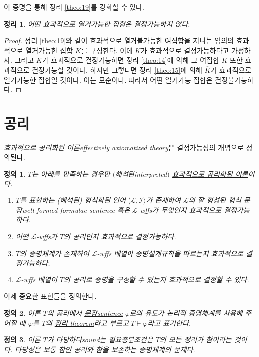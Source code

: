 \documentclass[a4paper,chapter,atbegshi]{oblivoir}
\newtheorem{defn}{정의}[chapter]
\newtheorem{theo}{정리}[chapter]
\begin{document}
이 증명을 통해 정리 \ref{theo:19}를 강화할 수 있다.
\begin{theo}
  어떤 효과적으로 열거가능한 집합은 결정가능하지 않다.
\end{theo}
\begin{proof}
  정리 \ref{theo:19}와 같이 효과적으로 열거불가능한 여집합을 지니는 임의의
  효과적으로 열거가능한 집합 $K$를 구성한다. 이에 $K$가 효과적으로 결정가능하다고
  가정하자. 그리고 $K$가 효과적으로 결정가능하면 정리 \ref{theo:14}에 의해
  그 여집합 $\overline{K}$ 또한 효과적으로 결정가능할 것이다. 하지만 그렇다면
  정리 \ref{theo:15}에 의해 $\overline{K}$가 효과적으로 열거가능한 집합일 것이다.
  이는 모순이다. 따라서 어떤 열거가능 집합은 결정불가능하다.
\end{proof}
\section{공리}
\emph{효과적으로 공리화된 이론\tiny effectively axiomatized theory}은
결정가능성의 개념으로 정의된다.
\begin{defn}\label{defn:15}
  $T$는 아래를 만족하는 경우만 $($해석된{\tiny interpreted}$)$
  \underline{효과적으로 공리화된 이론}이다.
  \begin{enumerate}
    \item $T$를 표현하는 (해석된) 형식화된 언어 $\langle\mathcal{L},\mathcal{I}
      \rangle$가 존재하여 $\mathcal{L}$의 잘 형성된 형식 문장{\tiny well-formed
      formulae sentence} 혹은 $\mathcal{L}$-wffs가 무엇인지 효과적으로 
      결정가능하다.
    \item 어떤 $\mathcal{L}$-wffs가 $T$의 공리인지 효과적으로 결정가능하다. 
    \item $T$의 증명체계가 존재하여 $\mathcal{L}$-wffs 배열이 증명설계규칙을
      따르는지 효과적으로 결정가능하다.
    \item $\mathcal{L}$-wffs 배열이 $T$의 공리로 증명을 구성할 수 있는지
      효과적으로 결정할 수 있다.
  \end{enumerate}
\end{defn}
이제 중요한 표현들을 정의한다. 
\begin{defn}\label{defn:16}
  이론 $T$의 공리에서 \underline{문장\tiny sentence} $\varphi$로의 유도가
  논리적 증명체계를 사용해 주어질 때 $\varphi$를 $T$의 \underline{정리\tiny 
  theorem}라고 부르고 $T\vdash\varphi$라고 표기한다. 
\end{defn}
\begin{defn}\label{defn:17}
  이론 $T$가 \underline{타당하다\tiny sound}는 필요충분조건은 $T$의 모든 정리가
  참이라는 것이다. 타당성은 보통 참인 공리와 참을 보존하는 증명체계의 문제다.
\end{defn}
\end{document}
